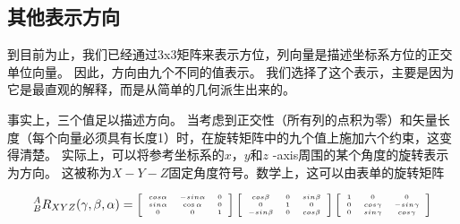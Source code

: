 \subsection{其他表示方向}


到目前为止，我们已经通过3x3矩阵来表示方位，列向量是描述坐标系方位的正交单位向量。 因此，方向由九个不同的值表示。 我们选择了这个表示，主要是因为它是最直观的解释，而是从简单的几何派生出来的。


事实上，三个值足以描述方向。 当考虑到正交性（所有列的点积为零）和矢量长度（每个向量必须具有长度1）时，在旋转矩阵中的九个值上施加六个约束，这变得清楚。 实际上，可以将参考坐标系的$ x $，$ y $和$ z $ -axis周围的某个角度的旋转表示为方向。 这被称为$ X-Y-Z $固定角度符号。数学上，这可以由表单的旋转矩阵

\begin{equation}
\tiny
^A_BR_{XYZ}(\gamma,\beta,\alpha)=\left[\begin{array}{ccc}cos\alpha & -sin\alpha & 0\\sin\alpha & \cos\alpha & 0\\0 & 0 & 1\end{array}\right]\left[\begin{array}{ccc}cos\beta& 0 & sin\beta\\0 & 1 & 0\\-sin\beta & 0 & cos\beta\end{array}\right]\left[\begin{array}{ccc}1 & 0 & 0 \\0 & cos\gamma & -sin\gamma\\0 & sin\gamma & cos\gamma\end{array}\right]
\end{equation}

